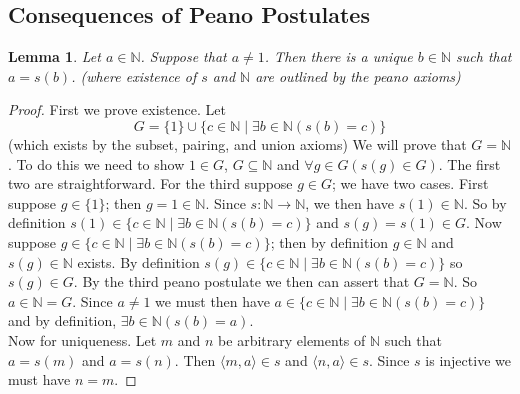 \documentclass{report}
\newtheorem{lemma}[theo]{Lemma}
\begin{document}
\subsection{Consequences of Peano Postulates}
\begin{lemma}\label{predecessor}
Let $a\in\mathbb N$. Suppose that $a\neq 1$. Then there is a unique $b\in\mathbb N$ such that $a=s(b)$. (where existence of $s$ and $\mathbb N$ are outlined by the peano axioms)
\end{lemma}
\begin{proof}
First we prove existence. Let 
\begin{equation*}
G=\{1\}\cup\{c\in\mathbb N\mid \exists b\in\mathbb N(s(b)=c)\}
\end{equation*}
(which exists by the subset, pairing, and union axioms) We will prove that $G=\mathbb N$. To do this we need to show $1\in G$, $G\subseteq\mathbb N$ and $\forall g\in G(s(g)\in G)$. 
The first two are 
straightforward. For the third suppose $g\in G$; we have two cases. First suppose $g\in\{1\}$; then $g=1\in\mathbb N$. Since $s:\mathbb N\to\mathbb N$, we then have $s(1)\in\mathbb N$.
So by definition $s(1)\in\{c\in\mathbb N\mid \exists b\in\mathbb N(s(b)=c)\}$ and $s(g)=s(1)\in G$.
Now suppose $g\in\{c\in\mathbb N\mid \exists b\in\mathbb N(s(b)=c)\}$; then by definition $g\in\mathbb N$ and $s(g)\in\mathbb N$ exists. 
By definition $s(g)\in\{c\in\mathbb N\mid \exists b\in\mathbb N(s(b)=c)\}$ so $s(g)\in G$. By the third peano postulate we then can assert that $G=\mathbb N$.
So $a\in\mathbb N=G$. Since $a\neq 1$ we must then have $a\in\{c\in\mathbb N\mid \exists b\in\mathbb N(s(b)=c)\}$ and by definition, $\exists b\in\mathbb N(s(b)=a)$.\\
\indent Now for uniqueness. Let $m$ and $n$ be arbitrary elements of $\mathbb N$ such that $a=s(m)$ and $a=s(n)$. Then $\langle m,a\rangle\in s$ and $\langle n,a\rangle\in s$. Since $s$ is injective
we must have $n=m$.
\end{proof}
\end{document}
